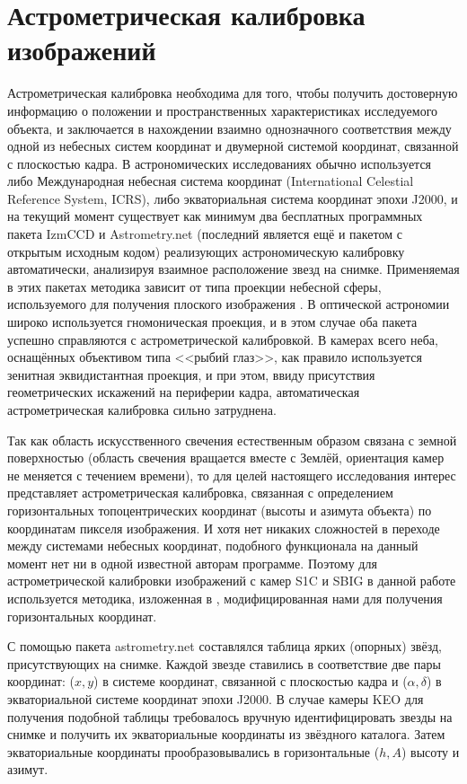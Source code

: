 \documentclass[12pt,a4paper]{article}
\begin{document}
\section{Астрометрическая калибровка изображений} \label{sec:astro_cal}
Астрометрическая калибровка необходима для того, чтобы получить достоверную информацию о положении и пространственных характеристиках исследуемого объекта, и заключается в нахождении взаимно однозначного соответствия между одной из небесных систем координат и двумерной системой координат, связанной с плоскостью кадра. В астрономических исследованиях обычно используется либо Международная небесная система координат (International Celestial Reference System, ICRS), либо экваториальная система координат эпохи J2000, и на текущий момент существует как минимум два бесплатных программных пакета IzmCCD \cite{Izmccd,Izmailov2010} и Astrometry.net \cite{Astrometry.net, Lang2010} (последний является ещё и пакетом с открытым исходным кодом) реализующих астрономическую калибровку автоматически, анализируя взаимное расположение звезд на снимке. Применяемая в этих пакетах методика зависит от типа проекции небесной сферы, используемого для получения плоского изображения \cite{Calabretta2002}. В оптической астрономии широко используется гномоническая проекция, и в этом случае оба пакета успешно справляются с астрометрической калибровкой. В камерах всего неба, оснащённых объективом типа <<рыбий глаз>>, как правило используется зенитная эквидистантная проекция, и при этом, ввиду присутствия геометрических искажений на периферии кадра, автоматическая астрометрическая калибровка сильно затруднена.

Так как область искусственного свечения естественным образом связана с земной поверхностью (область свечения вращается вместе с Землёй, ориентация камер не меняется с течением времени), то для целей настоящего исследования интерес представляет астрометрическая калибровка, связанная с определением горизонтальных топоцентрических координат (высоты и азимута объекта) по координатам пикселя изображения. И хотя нет никаких сложностей в переходе между системами небесных координат, подобного функционала на данный момент нет ни в одной известной авторам программе. Поэтому для астрометрической калибровки изображений с камер S1C и SBIG в данной работе используется методика, изложенная в \cite{Montenbruck2000}, модифицированная нами для получения горизонтальных координат.

С помощью пакета astrometry.net составлялся таблица ярких (опорных) звёзд, присутствующих на снимке. Каждой звезде ставились в соответствие две пары координат: ($x,y$) в системе координат, связанной с плоскостью кадра и ($\alpha, \delta$) в экваториальной системе координат эпохи J2000. В случае камеры KEO для получения подобной таблицы требовалось вручную идентифицировать звезды на снимке и получить их экваториальные координаты из звёздного каталога. Затем экваториальные координаты прообразовывались в горизонтальные ($h,A$) высоту и азимут.
\end{document}
